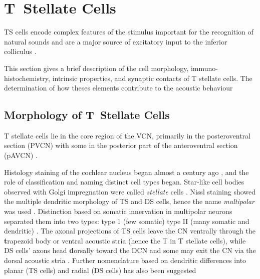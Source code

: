 \section{T~Stellate Cells}\label{sec:t-stellate-cells}

 TS cells encode complex features of the stimulus important for the recognition of
 natural sounds and are a major source of excitatory input to the inferior colliculus
 \citep{OertelWrightEtAl:2010}.

 This section gives a brief description of the cell morphology,
 immuno-histochemistry, intrinsic properties, and synaptic contacts of T stellate
 cells. The determination of how theses elements contribute to the acoustic behaviour

 \subsection{Morphology of T~Stellate Cells}\label{sec:morph-t-stell}

 T stellate cells lie in the core region of the VCN, primarily in the posteroventral
 section (PVCN) with some in the posterior part of the anteroventral section (pAVCN)
 \citep{Osen:1969,Lorente:1981,BrawerMorestEtAl:1974,OertelWuEtAl:1990,DoucetRyugo:2006,DoucetRyugo:1997}.

 Histology staining of the cochlear nucleus began almost a century ago
 \citep{Lorente:1933}, and the role of classification and naming distinct cell types
 began. Star-like cell bodies observed with Golgi impregnation were called
 \textit{stellate} cells \citep{Osen:1969}. Nissl staining showed the multiple
 dendritic morphology of TS and DS cells, hence the name \textit{multipolar} was used
 \citep{BrawerMorestEtAl:1974,Lorente:1981}.  Distinction based on somatic
 innervation in multipolar neurons separated them into two types: type 1 (few
 somatic) type II (many somatic and dendritic) \citep{Cant:1981}.  The axonal
 projections of TS cells leave the CN ventrally through the \textbf{t}rapezoid body
 or ventral acoustic stria (hence the T in T stellate cells), while DS cells' axons
 head \textbf{d}orsally toward the DCN and some may exit the CN via the dorsal
 acoustic stria \citep{OertelWuEtAl:1990}.  Further nomenclature based on dendritic
 differences into planar (TS cells) and radial (DS cells) has also been suggested
 \citep{DoucetRyugo:1997,DoucetRyugo:2006}


